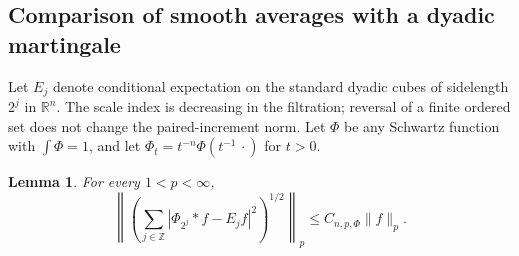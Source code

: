 \documentclass[11pt]{article}
\numberwithin{equation}{section}
\newtheorem{lemma}[theorem]{Lemma}
\theoremstyle{remark}
\theoremstyle{definition}
\begin{document}
\subsection{Comparison of smooth averages with a dyadic martingale}

Let $E_j$ denote conditional expectation on the standard dyadic cubes
of sidelength $2^j$ in $\mathbb R^n$. The scale index is decreasing in
the filtration; reversal of a finite ordered set does not change the
paired-increment norm. Let $\Phi$ be any Schwartz function with
$\int\Phi=1$, and let $\Phi_t=t^{-n}\Phi(t^{-1}\,\cdot)$ for $t>0$.

\begin{lemma}\label{radialmod:smooth-comparison}
For every $1<p<\infty$,
\begin{equation}\label{radialmod:comparison-square}
 \left\|\left(\sum_{j\in\mathbb Z}
       |\Phi_{2^j}*f-E_jf|^2\right)^{1/2}\right\|_p
 \le C_{n,p,\Phi}\|f\|_p.
\end{equation}
\end{lemma}
\end{document}
